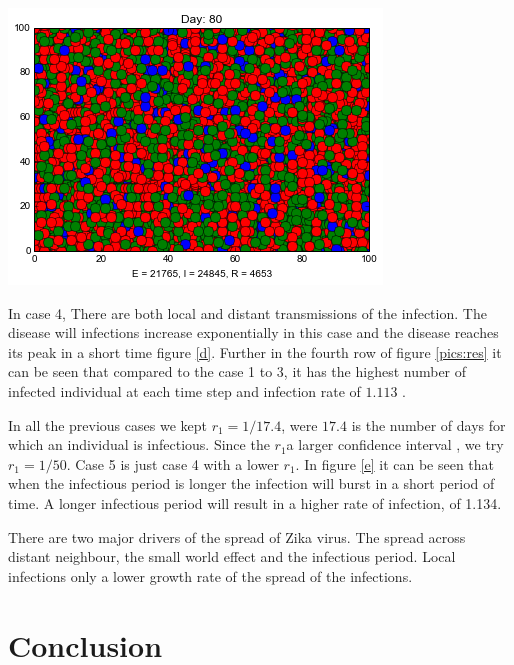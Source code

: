 \begin{minipage}{\linewidth}
\includegraphics[scale=0.28]{images/5t80.png} 

\label{pics:res}
\end{minipage}

In case 4, There are both local and distant transmissions of the infection. The disease will infections increase exponentially in this case and the disease reaches its peak in a short time figure \ref{d}. Further in the fourth row of figure \ref{pics:res} it can be seen that compared to the case 1 to 3, it has the highest number of infected individual at each time step and infection rate of $1.113$ .

In all the previous cases we kept $r_1 = 1/17.4$, were $17.4$ is the number of days for which an individual is infectious. Since the $r_1$a larger confidence interval \citep{lessler2016times}, we try  $r_1 = 1/50$. Case 5 is just case 4 with a lower $r_1$. In figure \ref{e} it can be seen that when the infectious period is longer the infection will burst in a short period of time. A longer infectious period will result in a higher rate of infection, of 1.134.

There are two major drivers of the spread of Zika virus. The spread across distant neighbour, the small world effect and the infectious period. Local infections only a lower growth rate of the spread of the infections.


\section{Conclusion}

